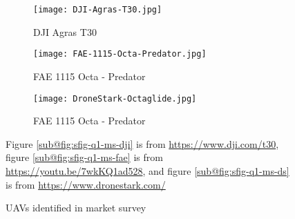 \begin{figure}[t]
    \centering
    \begin{subfigure}[b]{0.3\textwidth}
        \centering
        \texttt{[image: DJI-Agras-T30.jpg]}
        \caption{DJI Agras T30}
        \label{fig:sfig-q1-ms-dji}
    \end{subfigure}
    \begin{subfigure}[b]{0.3\textwidth}
        \centering
        \texttt{[image: FAE-1115-Octa-Predator.jpg]}
        \caption{FAE 1115 Octa - Predator}
        \label{fig:sfig-q1-ms-fae}
    \end{subfigure}
    \begin{subfigure}[b]{0.3\textwidth}
        \centering
        \texttt{[image: DroneStark-Octaglide.jpg]}
        \caption{FAE 1115 Octa - Predator}
        \label{fig:sfig-q1-ms-ds}
    \end{subfigure}
    \caption{UAVs identified in market survey}
    \label{fig:q1-market-survey}
    \small
        Figure \ref{sub@fig:sfig-q1-ms-dji} is from \url{https://www.dji.com/t30}, figure \ref{sub@fig:sfig-q1-ms-fae} is from \url{https://youtu.be/7wkKQ1ad528}, and figure \ref{sub@fig:sfig-q1-ms-ds} is from \url{https://www.dronestark.com/}
\end{figure}






